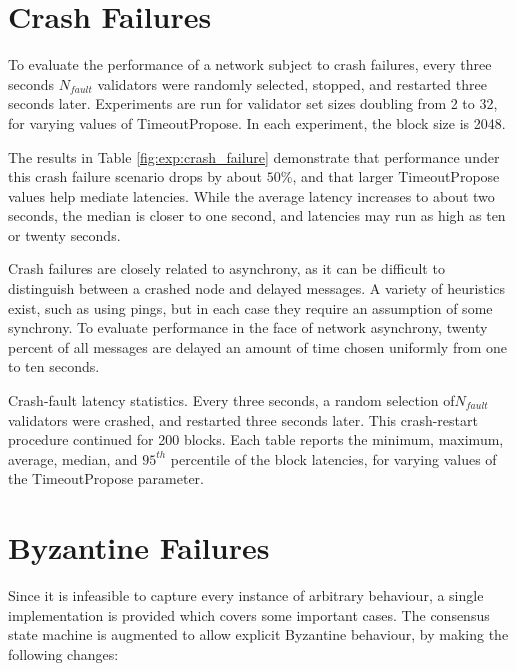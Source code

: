 \section{Crash Failures}

To evaluate the performance of a network subject to crash failures, 
every three seconds $N_{fault}$ validators were randomly selected,
stopped, and restarted three seconds later.
Experiments are run for validator set sizes doubling from 2 to 32, for varying values of TimeoutPropose.
In each experiment, the block size is 2048.

The results in Table \ref{fig:exp:crash_failure} demonstrate that 
performance under this crash failure scenario drops by about 
$50\%$, and that larger TimeoutPropose values help mediate latencies. 
While the average latency increases to about two seconds,
the median is closer to one second, and latencies may run as high as ten or twenty seconds.


\ifx
Crash failures are closely related to asynchrony, as it can be difficult to distinguish between a crashed node
and delayed messages. A variety of heuristics exist, such as using pings, 
but in each case they require an assumption of some synchrony. 
To evaluate performance in the face of network asynchrony, twenty percent of all messages are delayed an amount of time chosen uniformly 
from one to ten seconds.
\fi

\begin{table}
	
	\caption[Latency statistics under crash faults]{Crash-fault latency statistics. Every three seconds, a random selection of$N_{fault}$ validators were crashed, and restarted three seconds later. This crash-restart procedure continued for 200 blocks. Each table reports the minimum, maximum, average, median, and $95^{th}$ percentile of the block latencies, for varying values of the TimeoutPropose parameter.}
	\label{fig:exp:crash_failure}
\end{table}


\section{Byzantine Failures}

Since it is infeasible to capture every instance of arbitrary behaviour,
a single implementation is provided which covers some important cases.
The consensus state machine is augmented to allow explicit Byzantine behaviour,
by making the following changes:

